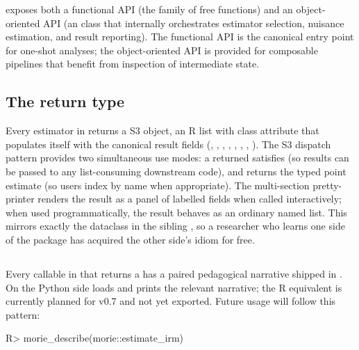 \documentclass[article,shortnames,nojss]{jss}
\begin{document}
 exposes both a functional API (the
 family of free functions) and an
object-oriented API (an   class that
internally orchestrates estimator selection, nuisance estimation,
and result reporting). The functional API is the canonical entry
point for one-shot analyses; the object-oriented API is provided
for composable pipelines that benefit from inspection of
intermediate state.

\subsection[The morie result return type]{The  return type}\label{sec:richresult}

Every estimator in  returns a  S3
object, an R list with class attribute  that
populates itself with the canonical result fields
(, , , ,
, , ,
).  The S3 dispatch pattern provides two
simultaneous use modes: a returned  satisfies
 (so results can be passed to any
list-consuming downstream code), and 
returns the typed point estimate (so users index by name when
appropriate).  The multi-section pretty-printer
 renders the result as a panel of
labelled fields when called interactively; when used
programmatically, the result behaves as an ordinary named list.
This mirrors exactly the  dataclass in the
 sibling \citep{Ruhela2026MoriePy}, so a
researcher who learns one side of the package has acquired the
other side's idiom for free.

\subsection[describe()]{}\label{sec:describe}

Every callable in  that returns a 
has a paired  pedagogical narrative
shipped in .  On the Python side  loads and prints the
relevant narrative; the R equivalent is currently planned for v0.7
and not yet exported. Future usage will follow this pattern:

\begin{Code}
R> morie_describe(morie::estimate_irm)
\end{Code}
\end{document}
